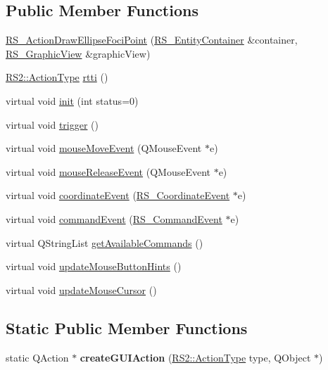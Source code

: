 \subsection*{Public Member Functions}
\begin{DoxyCompactItemize}
\item 
\hyperlink{classRS__ActionDrawEllipseFociPoint_a7e1f9986942572741a5436a3322387a0}{R\-S\-\_\-\-Action\-Draw\-Ellipse\-Foci\-Point} (\hyperlink{classRS__EntityContainer}{R\-S\-\_\-\-Entity\-Container} \&container, \hyperlink{classRS__GraphicView}{R\-S\-\_\-\-Graphic\-View} \&graphic\-View)
\item 
\hyperlink{classRS2_afe3523e0bc41fd637b892321cfc4b9d7}{R\-S2\-::\-Action\-Type} \hyperlink{classRS__ActionDrawEllipseFociPoint_a61acc96ee48669a883205859a6d4e8aa}{rtti} ()
\item 
virtual void \hyperlink{classRS__ActionDrawEllipseFociPoint_ae40d5109a4ed895d36463204c53b6b5b}{init} (int status=0)
\item 
virtual void \hyperlink{classRS__ActionDrawEllipseFociPoint_a71efc76a9e9eb3a520a9a50ef5a0915b}{trigger} ()
\item 
virtual void \hyperlink{classRS__ActionDrawEllipseFociPoint_aea87cc96d2a4d4dab99dde5e65c80169}{mouse\-Move\-Event} (Q\-Mouse\-Event $\ast$e)
\item 
virtual void \hyperlink{classRS__ActionDrawEllipseFociPoint_a1b9e61b81ec13df06d23c5dcf57a7942}{mouse\-Release\-Event} (Q\-Mouse\-Event $\ast$e)
\item 
virtual void \hyperlink{classRS__ActionDrawEllipseFociPoint_af87b1cdc8f40d8c04ce4c87c4809aafd}{coordinate\-Event} (\hyperlink{classRS__CoordinateEvent}{R\-S\-\_\-\-Coordinate\-Event} $\ast$e)
\item 
virtual void \hyperlink{classRS__ActionDrawEllipseFociPoint_a8204b5f78c624ded0ca22d877b4b4454}{command\-Event} (\hyperlink{classRS__CommandEvent}{R\-S\-\_\-\-Command\-Event} $\ast$e)
\item 
virtual Q\-String\-List \hyperlink{classRS__ActionDrawEllipseFociPoint_aa50e971642f10797d91e234318c9543d}{get\-Available\-Commands} ()
\item 
virtual void \hyperlink{classRS__ActionDrawEllipseFociPoint_a94aa2c52b1a97febdfbbad209890105e}{update\-Mouse\-Button\-Hints} ()
\item 
virtual void \hyperlink{classRS__ActionDrawEllipseFociPoint_aacda725cd5820afda757d247cb8236aa}{update\-Mouse\-Cursor} ()
\end{DoxyCompactItemize}
\subsection*{Static Public Member Functions}
\begin{DoxyCompactItemize}
\item 
\hypertarget{classRS__ActionDrawEllipseFociPoint_a1b350f69864b37791c6314d42fdf9285}{static Q\-Action $\ast$ {\bfseries create\-G\-U\-I\-Action} (\hyperlink{classRS2_afe3523e0bc41fd637b892321cfc4b9d7}{R\-S2\-::\-Action\-Type} type, Q\-Object $\ast$)}\label{classRS__ActionDrawEllipseFociPoint_a1b350f69864b37791c6314d42fdf9285}

\end{DoxyCompactItemize}
